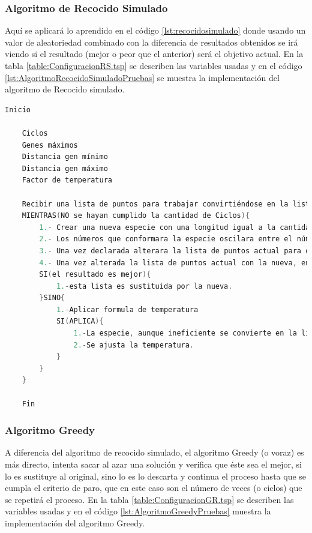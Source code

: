 \subsubsection{Algoritmo de Recocido Simulado}
Aquí se aplicará lo aprendido en el código \ref{lst:recocidosimulado} donde usando un valor de aleatoriedad combinado con la diferencia de resultados obtenidos se irá viendo si el resultado (mejor o peor que el anterior) será el objetivo actual. En la tabla \ref{table:ConfiguracionRS.tsp} se describen las variables usadas y en el código \ref{lst:AlgoritmoRecocidoSimuladoPruebas} se muestra la implementación del algoritmo de Recocido simulado.  

 

\begin{lstlisting}[language=C++, caption=Algoritmo de recocido simulado aplicado en las pruebas, label=lst:AlgoritmoRecocidoSimuladoPruebas]
    Inicio
    
    Ciclos
    Genes máximos
    Distancia gen mínimo
    Distancia gen máximo
    Factor de temperatura
    
    Recibir una lista de puntos para trabajar convirtiéndose en la lista de puntos actual.
    MIENTRAS(NO se hayan cumplido la cantidad de Ciclos){
    	1.- Crear una nueva especie con una longitud igual a la cantidad de genes máximos.
    	2.- Los números que conformara la especie oscilara entre el número mínimo y máximo declarados anteriormente.
    	3.- Una vez declarada alterara la lista de puntos actual para obtener una lista nueva.
    	4.- Una vez alterada la lista de puntos actual con la nueva, en caso de obtener un mejor resultado 
    	SI(el resultado es mejor){
    		1.-esta lista es sustituida por la nueva.
    	}SINO{
    		1.-Aplicar formula de temperatura
    		SI(APLICA){
    		    1.-La especie, aunque ineficiente se convierte en la lista de puntos actual.
    		    2.-Se ajusta la temperatura.
    		}
    	}
    }
    
    Fin
\end{lstlisting}

\clearpage \newpage

\subsubsection{Algoritmo Greedy}
A diferencia del algoritmo de recocido simulado, el algoritmo Greedy (o voraz) es más directo, intenta sacar al azar una solución y verifica que éste sea el mejor, si lo es sustituye al original, sino lo es lo descarta y continua el proceso hasta que se cumpla el criterio de paro, que en este caso son el número de veces (o ciclos) que se repetirá el proceso. En la tabla \ref{table:ConfiguracionGR.tsp} se describen las variables usadas y en el código \ref{lst:AlgoritmoGreedyPruebas} muestra la implementación del algoritmo Greedy.

